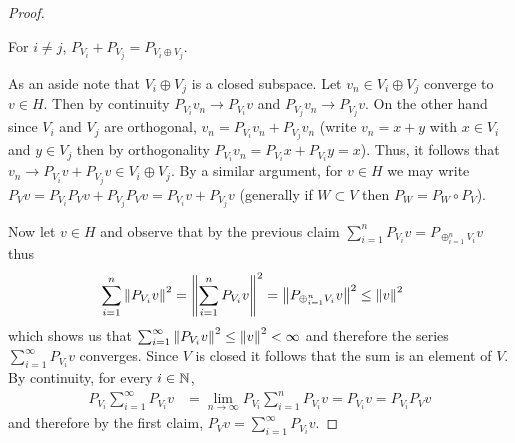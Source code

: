 \begin{proof}
\begin{clm}For $i \neq j$, $P_{V_i} + P_{V_j} = P_{V_i \oplus V_j}$.
\end{clm}
As an aside note that $V_i \oplus V_j$ is a closed subspace.  Let $v_n \in V_i \oplus V_j$ converge to $v \in H$.  Then by continuity $P_{V_i} v_n \to P_{V_i} v$ and $P_{V_j} v_n \to P_{V_j} v$.  On the other hand since $V_i$ and $V_j$ are orthogonal, $v_n = P_{V_i} v_n + P_{V_j} v_n$ (write $v_n = x + y$ with $x \in V_i$ and $y \in V_j$ then by orthogonality $P_{V_i} v_n = P_{V_i} x + P_{V_i} y = x$).  Thus, it follows that $v_n \to P_{V_i} v+P_{V_j} v \in V_i \oplus V_j$.  By a similar argument, for $v \in H$ we may write $P_V v = P_{V_i} P_V v + P_{V_j} P_V v = P_{V_i} v + P_{V_j} v$ (generally if $W \subset V$ then $P_W = P_W \circ P_V$).

Now let $v \in H$ and observe that by the previous claim $\sum_{i=1}^n P_{V_i} v = P_{\oplus_{i=1}^n V_i} v$  thus 
\begin{align*}
\sum_{i=1}^n \left \lVert P_{V_i} v \right \rVert^2 &= \left \lVert \sum_{i=1}^n  P_{V_i} v \right \rVert^2 = \left \lVert P_{\oplus_{i=1}^n V_i} v \right \rVert^2 \leq \left \lVert v \right \rVert^2
\end{align*}
which shows us that $\sum_{i=1}^\infty \left \lVert P_{V_i} v \right \rVert^2 \leq \left \lVert v \right \rVert^2 < \infty$ and therefore the series $\sum_{i=1}^\infty P_{V_i} v$ converges.  Since $V$ is closed it follows that the sum is an element of $V$.  By continuity, for every $i \in \mathbb{N}$, 
\begin{align*}
P_{V_i} \sum_{i=1}^\infty P_{V_i} v &= \lim_{n \to \infty} P_{V_i} \sum_{i=1}^n P_{V_i} v =P_{V_i} v = P_{V_i} P_V v
\end{align*}
and therefore by the first claim, $P_V v = \sum_{i=1}^\infty P_{V_i} v$.
\end{proof}

